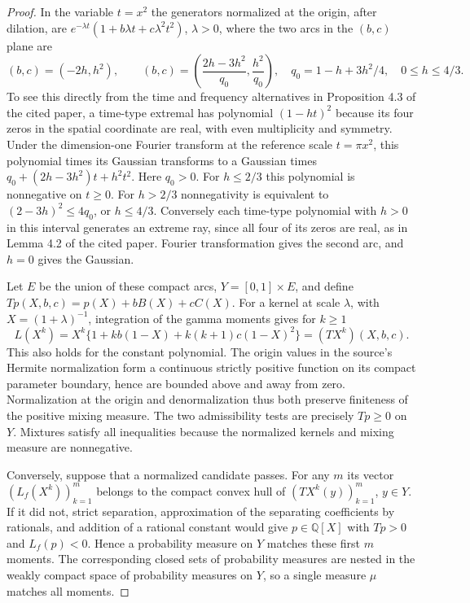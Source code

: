 \documentclass[11pt,a4paper]{article}
\numberwithin{equation}{section}
\begin{document}
\begin{proof}
In the variable $t=x^2$ the generators normalized at the origin, after
dilation, are $e^{-\lambda t}(1+b\lambda t+c\lambda^2t^2)$, $\lambda>0$,
where the two arcs in the $(b,c)$ plane are
\[
 (b,c)=(-2h,h^2),\qquad
 (b,c)=\left(\frac{2h-3h^2}{q_0},\frac{h^2}{q_0}\right),
 \quad q_0=1-h+3h^2/4,\quad 0\le h\le4/3 .
\]
To see this directly from the time and frequency alternatives in
Proposition 4.3 of the cited paper, a time-type extremal has polynomial
$(1-ht)^2$ because its four zeros in the spatial coordinate are real,
with even multiplicity and symmetry. Under the dimension-one Fourier
transform at the reference scale $t=\pi x^2$, this polynomial times its
Gaussian transforms to a Gaussian times
$q_0+(2h-3h^2)t+h^2t^2$. Here $q_0>0$. For $h\le2/3$ this polynomial
is nonnegative on $t\ge0$. For $h>2/3$ nonnegativity is equivalent
to $(2-3h)^2\le4q_0$, or $h\le4/3$. Conversely each time-type
polynomial with $h>0$ in this interval generates an extreme ray, since
all four of its zeros are real, as in Lemma 4.2 of the cited paper.
Fourier transformation gives the second arc, and $h=0$ gives the Gaussian.

Let $E$ be the union of these compact arcs, $Y=[0,1]\times E$, and
define $Tp(X,b,c)=p(X)+bB(X)+cC(X)$. For a kernel at scale $\lambda$,
with $X=(1+\lambda)^{-1}$, integration of the gamma moments gives for
$k\ge1$
\[
 L(X^k)=X^k\{1+kb(1-X)+k(k+1)c(1-X)^2\}=(TX^k)(X,b,c).
\]
This also holds for the constant polynomial. The origin values in the source's Hermite normalization form a continuous
strictly positive function on its compact parameter boundary, hence are bounded
above and away from zero. Normalization at the origin and denormalization
thus both preserve finiteness of the positive mixing measure.
The two admissibility tests
are precisely $Tp\ge0$ on $Y$. Mixtures satisfy all inequalities because
the normalized kernels and mixing measure are nonnegative.

Conversely, suppose that a normalized candidate passes. For any $m$ its
vector $(L_f(X^k))_{k=1}^m$ belongs to the compact convex hull of
$(TX^k(y))_{k=1}^m$, $y\in Y$. If it did not, strict separation,
approximation of the separating coefficients by rationals, and addition
of a rational constant would give $p\in\mathbb Q[X]$ with
$Tp>0$ and $L_f(p)<0$. Hence a probability measure on $Y$ matches these
first $m$ moments. The corresponding closed sets of probability measures
are nested in the weakly compact space of probability measures on $Y$,
so a single measure $\mu$ matches all moments.


\end{proof}
\end{document}
